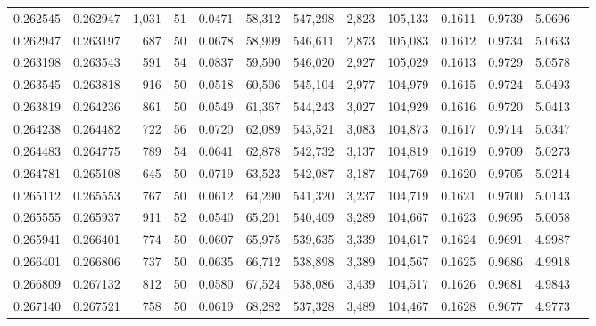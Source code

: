 \begin{tabular}{rrrrrrrrrrrrr}
0.262545 & 0.262947 & 1,031 &  51 &                                     0.0471 &  58,312 & 547,298 &   2,823 & 105,133 & 0.1611 & 0.9739 & 5.0696 \\
0.262947 & 0.263197 &   687 &  50 &                                     0.0678 &  58,999 & 546,611 &   2,873 & 105,083 & 0.1612 & 0.9734 & 5.0633 \\
0.263198 & 0.263543 &   591 &  54 &                                     0.0837 &  59,590 & 546,020 &   2,927 & 105,029 & 0.1613 & 0.9729 & 5.0578 \\
0.263545 & 0.263818 &   916 &  50 &                                     0.0518 &  60,506 & 545,104 &   2,977 & 104,979 & 0.1615 & 0.9724 & 5.0493 \\
0.263819 & 0.264236 &   861 &  50 &                                     0.0549 &  61,367 & 544,243 &   3,027 & 104,929 & 0.1616 & 0.9720 & 5.0413 \\
0.264238 & 0.264482 &   722 &  56 &                                     0.0720 &  62,089 & 543,521 &   3,083 & 104,873 & 0.1617 & 0.9714 & 5.0347 \\
0.264483 & 0.264775 &   789 &  54 &                                     0.0641 &  62,878 & 542,732 &   3,137 & 104,819 & 0.1619 & 0.9709 & 5.0273 \\
0.264781 & 0.265108 &   645 &  50 &                                     0.0719 &  63,523 & 542,087 &   3,187 & 104,769 & 0.1620 & 0.9705 & 5.0214 \\
0.265112 & 0.265553 &   767 &  50 &                                     0.0612 &  64,290 & 541,320 &   3,237 & 104,719 & 0.1621 & 0.9700 & 5.0143 \\
0.265555 & 0.265937 &   911 &  52 &                                     0.0540 &  65,201 & 540,409 &   3,289 & 104,667 & 0.1623 & 0.9695 & 5.0058 \\
0.265941 & 0.266401 &   774 &  50 &                                     0.0607 &  65,975 & 539,635 &   3,339 & 104,617 & 0.1624 & 0.9691 & 4.9987 \\
0.266401 & 0.266806 &   737 &  50 &                                     0.0635 &  66,712 & 538,898 &   3,389 & 104,567 & 0.1625 & 0.9686 & 4.9918 \\
0.266809 & 0.267132 &   812 &  50 &                                     0.0580 &  67,524 & 538,086 &   3,439 & 104,517 & 0.1626 & 0.9681 & 4.9843 \\
0.267140 & 0.267521 &   758 &  50 &                                     0.0619 &  68,282 & 537,328 &   3,489 & 104,467 & 0.1628 & 0.9677 & 4.9773 \\

\end{tabular}
